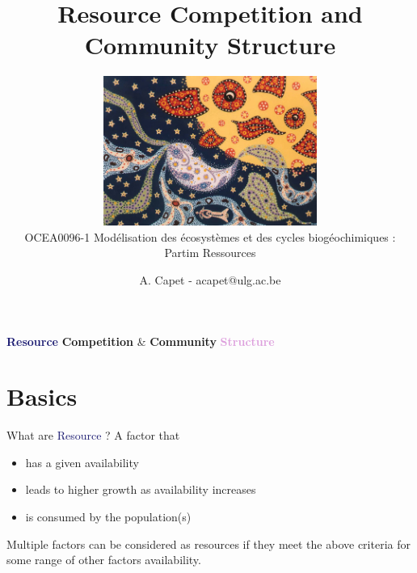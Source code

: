 \documentclass[final,xcolor=dvipsnames]{beamer}
\title[Resource Competition]{Resource Competition and Community Structure}
\subtitle{\vspace{3mm}
\includegraphics[width=7cm]{the-sun-is-in-love-with-the-moon-collab-with-blaak.jpg} \\
\vspace{2mm}
OCEA0096-1 Modélisation des écosystèmes et des cycles biogéochimiques : Partim Ressources}
\author[A. Capet]{A. Capet - acapet@ulg.ac.be} %
\date[2017-2018]
\begin{document}

\begin{frame}
  \titlepage
\end{frame}



\begin{frame}
\large
\centering
\textbf<1>{\textcolor{MidnightBlue}{Resource}} \textbf<2>{\textcolor{Emerald}{Competition}} \& \textbf<3>{\textcolor{BurntOrange}{Community}} \textbf<4>{\textcolor{Plum}{Structure}} \\
\vspace{2cm}
\end{frame}



\section{Basics}

\begin{frame}{What are \textcolor{MidnightBlue}{Resource} ?}
 A factor that
 \begin{itemize}
 \item has a given availability
 \item leads to higher growth as availability increases
 \item is consumed by the population(s)
 \end{itemize}
 Multiple factors can be considered as resources if they meet the above criteria for some range of other factors availability.
\end{frame}
\end{document}
